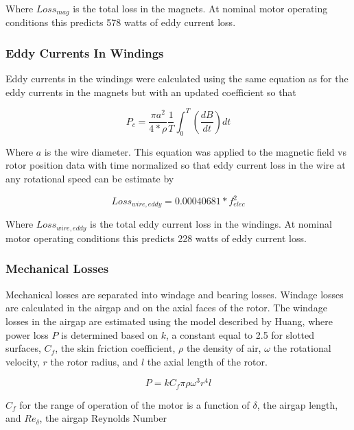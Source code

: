\documentclass[]{aiaa-tc}%
\begin{document}
Where $Loss_{mag}$ is the total loss in the magnets. At nominal motor operating conditions this predicts 578 watts of eddy current loss.

\subsubsection{Eddy Currents In Windings}
Eddy currents in the windings were calculated using the same equation as for the eddy currents in the magnets but with an updated coefficient so that

\begin{equation}
P_{c} = \frac{\pi a^2}{4*\rho}\frac{1}{T}\int_{0}^{T}(\frac{dB}{dt})dt
\label{eq:EddyLoss3}
\end{equation}

Where $a$ is the wire diameter. This equation was applied to the magnetic field vs rotor position data with time normalized so that eddy current loss in the wire at any rotational speed can be estimate by

\begin{equation}
Loss_{wire,eddy} = 0.00040681*f_{elec}^{2}
\label{eq:EddyLoss4}
\end{equation}

Where $Loss_{wire,eddy}$ is the total eddy current loss in the windings. At nominal motor operating conditions this predicts 228 watts of eddy current loss.

\subsubsection{Mechanical Losses}

Mechanical losses are separated into windage and bearing losses. Windage losses are calculated in the airgap and on the axial faces of the rotor. 
The windage losses in the airgap are estimated using the model described by Huang,\cite{Huang} where power loss $P$ is determined based on $k$, a constant equal to 2.5 for slotted surfaces, $C_{f}$, the skin friction coefficient, $\rho$ the density of air, $\omega$ the rotational velocity, $r$ the rotor radius, and $l$ the axial length of the rotor.

\begin{equation}
P = kC_{f}\pi\rho\omega^{3}r^{4}l
\label{eq:Windage}
\end{equation}

$C_{f}$ for the range of operation of the motor is a function of $\delta$, the airgap length, and $Re_{\delta}$, the airgap Reynolds Number
\end{document}
